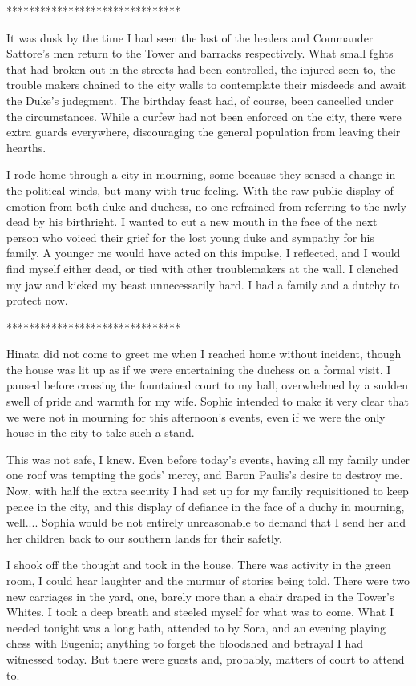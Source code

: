 \documentclass{article}
\begin{document}
*******************************

It was dusk by the time I had seen the last of the healers and Commander Sattore's men return to the Tower and barracks respectively. What small fghts that had broken out in the streets had been controlled, the injured seen to, the trouble makers chained to the city walls to contemplate their misdeeds and await the Duke's judegment. The birthday feast had, of course, been cancelled under the circumstances. While a curfew had not been enforced on the city, there were extra guards everywhere, discouraging the general population from leaving their hearths.

I rode home through a city in mourning, some because they sensed a change in the political winds, but many with true feeling. With the raw public display of emotion from both duke and duchess, no one refrained from referring to the nwly dead by his birthright. I wanted to cut a new mouth in the face of the next person who voiced their grief for the lost young duke and sympathy for his family. A younger me would have acted on this impulse, I reflected, and I would find myself either dead, or tied with other troublemakers at the wall. I clenched my jaw and kicked my beast unnecessarily hard. I had a family and a dutchy to protect now.

*******************************

Hinata did not come to greet me when I reached home without incident, though the house was lit up as if we were entertaining the duchess on a formal visit. I paused before crossing the fountained court to my hall, overwhelmed by a sudden swell of pride and warmth for my wife. Sophie intended to make it very clear that we were not in mourning for this afternoon's events, even if we were the only house in the city to take such a stand.

This was not safe, I knew. Even before today's events, having all my family under one roof was tempting the gods' mercy, and Baron Paulis's desire to destroy me. Now, with half the extra security I had set up for my family requisitioned to keep peace in the city, and this display of defiance in the face of a duchy in mourning, well.... Sophia would be not entirely unreasonable to demand that I send her and her children back to our southern lands for their safetly.

I shook off the thought and took in the house. There was activity in the green room, I could hear laughter and the murmur of stories being told. There were two new carriages in the yard, one, barely more than a chair draped in the  Tower's Whites. I took a deep breath and steeled myself for what was to come. What I needed tonight was a long bath, attended to by Sora, and an evening playing chess with Eugenio; anything to forget the bloodshed and betrayal I had witnessed today. But there were guests and, probably, matters of court to attend to.
\end{document}
